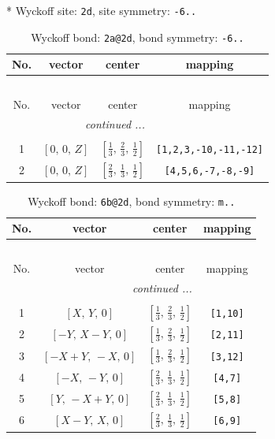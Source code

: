\documentclass[fleqn,8pt]{jsarticle}
\begin{document}
* Wyckoff site: {\tt 2d}, site symmetry: {\tt -6..}
\renewcommand{\arraystretch}{1.2}
\begin{longtable}{cccc}
\caption{Wyckoff bond: {\tt 2a@2d}, bond symmetry: {\tt -6..}}
 \\
 \hline \hline
No. & vector & center & mapping \\ \hline \endfirsthead

\multicolumn{3}{l}{\tablename\ \thetable{}} \\
 \hline \hline
No. & vector & center & mapping \\ \hline \endhead

 \hline \hline
\multicolumn{3}{r}{\footnotesize\it continued ...} \\ \endfoot

 \hline \hline
\multicolumn{3}{r}{} \\ \endlastfoot

1 & $\left[ 0,\, 0,\, Z \right]$ & $\left[ \frac{1}{3},\, \frac{2}{3},\, \frac{1}{2} \right]$ & {\tt [1,2,3,-10,-11,-12]} \\ \hline
2 & $\left[ 0,\, 0,\, Z \right]$ & $\left[ \frac{2}{3},\, \frac{1}{3},\, \frac{1}{2} \right]$ & {\tt [4,5,6,-7,-8,-9]} \\
\end{longtable}
\renewcommand{\arraystretch}{1.2}
\begin{longtable}{cccc}
\caption{Wyckoff bond: {\tt 6b@2d}, bond symmetry: {\tt m..}}
 \\
 \hline \hline
No. & vector & center & mapping \\ \hline \endfirsthead

\multicolumn{3}{l}{\tablename\ \thetable{}} \\
 \hline \hline
No. & vector & center & mapping \\ \hline \endhead

 \hline \hline
\multicolumn{3}{r}{\footnotesize\it continued ...} \\ \endfoot

 \hline \hline
\multicolumn{3}{r}{} \\ \endlastfoot

1 & $\left[ X,\, Y,\, 0 \right]$ & $\left[ \frac{1}{3},\, \frac{2}{3},\, \frac{1}{2} \right]$ & {\tt [1,10]} \\ \hline
2 & $\left[ - Y,\, X - Y,\, 0 \right]$ & $\left[ \frac{1}{3},\, \frac{2}{3},\, \frac{1}{2} \right]$ & {\tt [2,11]} \\ \hline
3 & $\left[ - X + Y,\, - X,\, 0 \right]$ & $\left[ \frac{1}{3},\, \frac{2}{3},\, \frac{1}{2} \right]$ & {\tt [3,12]} \\ \hline
4 & $\left[ - X,\, - Y,\, 0 \right]$ & $\left[ \frac{2}{3},\, \frac{1}{3},\, \frac{1}{2} \right]$ & {\tt [4,7]} \\ \hline
5 & $\left[ Y,\, - X + Y,\, 0 \right]$ & $\left[ \frac{2}{3},\, \frac{1}{3},\, \frac{1}{2} \right]$ & {\tt [5,8]} \\ \hline
6 & $\left[ X - Y,\, X,\, 0 \right]$ & $\left[ \frac{2}{3},\, \frac{1}{3},\, \frac{1}{2} \right]$ & {\tt [6,9]} \\
\end{longtable}
\end{document}
